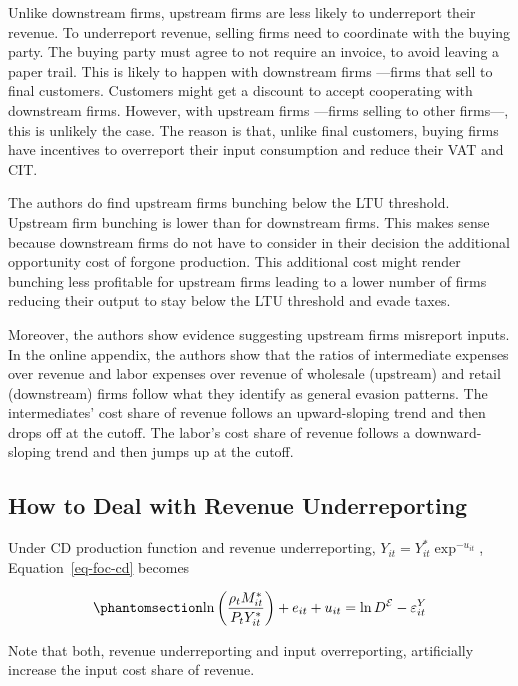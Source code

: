 \documentclass[
  12pt]{article}
\begin{document}
Unlike downstream firms, upstream firms are less likely to underreport
their revenue. To underreport revenue, selling firms need to coordinate
with the buying party. The buying party must agree to not require an
invoice, to avoid leaving a paper trail. This is likely to happen with
downstream firms ---firms that sell to final customers. Customers might
get a discount to accept cooperating with downstream firms. However,
with upstream firms ---firms selling to other firms---, this is unlikely
the case. The reason is that, unlike final customers, buying firms have
incentives to overreport their input consumption and reduce their VAT
and CIT.

The authors do find upstream firms bunching below the LTU threshold.
Upstream firm bunching is lower than for downstream firms. This makes
sense because downstream firms do not have to consider in their decision
the additional opportunity cost of forgone production. This additional
cost might render bunching less profitable for upstream firms leading to
a lower number of firms reducing their output to stay below the LTU
threshold and evade taxes.

Moreover, the authors show evidence suggesting upstream firms misreport
inputs. In the online appendix, the authors show that the ratios of
intermediate expenses over revenue and labor expenses over revenue of
wholesale (upstream) and retail (downstream) firms follow what they
identify as general evasion patterns. The intermediates' cost share of
revenue follows an upward-sloping trend and then drops off at the
cutoff. The labor's cost share of revenue follows a downward-sloping
trend and then jumps up at the cutoff.

\subsection{How to Deal with Revenue
Underreporting}\label{how-to-deal-with-revenue-underreporting}

Under CD production function and revenue underreporting,
\(Y_{it}=Y^*_{it}\exp^{-u_{it}}\), Equation~\ref{eq-foc-cd} becomes

\begin{equation}\phantomsection\label{eq-rev-under}{
    \ln\left(\frac{\rho_t M^*_{it}}{P_{t}Y^*_{it}}\right)+e_{it}+u_{it}=\ln D^{\mathcal{E}}- \varepsilon^Y_{it}
}\end{equation}

Note that both, revenue underreporting and input overreporting,
artificially increase the input cost share of revenue.
\end{document}
